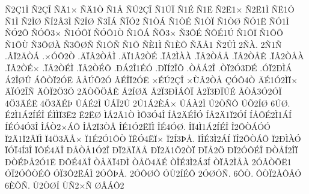 {^^d12^^c71^^cc
^^d12^^c7^^ce
^^d1^^c41^^d7
^^d1^^c41^^d2
^^d11^^c5
^^d1^^da2^^c7^^ce
^^d11^^da^^cf
^^d11^^c9
^^d11^^cb
^^d12^^cb1^^d7
^^d12^^cb1^^cc
^^d1^^cb1^^d3
^^d11^^cc
^^d12^^cc^^d8
^^d1^^cd2^^c23^^cc
^^d12^^cd^^d8
^^d13^^ce^^c1
^^d1^^ce^^d32
^^d11^^d2^^c1
^^d11^^d2^^c9
^^d11^^d2^^cf
^^d11^^d2^^d8
^^d1^^d31^^cb
^^d1^^d31^^cc
^^d1^^d32^^d4
^^d1^^d3^^d43^^d7
^^d11^^d3^^d4^^cf
^^d1^^d3^^d41^^d2
^^d11^^d4^^c1
^^d1^^d43^^d7
^^d13^^d4^^c9
^^d1^^d4^^c91^^da
^^d11^^d4^^cf
^^d11^^d4^^d5
^^d11^^d4^^d9
^^d13^^d4^^d8^^c0
^^d13^^d4^^d8^^d1
^^d11^^d4^^d1
^^d11^^d5
^^d1^^c81^^cc
^^d11^^c8^^d5
^^d1^^c3^^c51
^^d12^^db^^cc
2^^d1^^c0.
2^^d11^^d1
%
.^^c2^^cf2^^c4^^d2^^c1
.^^d7^^d3^^d42^^d2
.^^c4^^cf^^c22^^d2^^c5^^cc
.^^c4^^cf1^^c22^^d2^^c9
.^^cf^^c22^^cc^^c0^^c0
.^^cf^^c22^^d2^^c5^^c5
.^^cf^^c22^^d2^^c5^^ca
.^^cf^^c22^^d2^^c5^^c0
.^^cf^^c22^^d2^^c9^^d7
.^^cf^^c22^^d2^^c9^^cc
.^^cf^^c22^^d2^^c9^^d4
.^^d0^^c12^^ce1^^c9^^d3
.^^d0^^cf^^cd2^^ce^^d5
.^^d2^^c5^^c12^^ce
.^^d2^^cf2^^d33^^d0^^c9
.^^d3^^cf2^^d0^^cc^^c1
^^c12^^ce^^d8^^db
^^c1^^d4^^d2^^cf2^^d3^^cb
^^c2^^c5^^da^^d52^^d3
^^c2^^c9^^ce^^cf2^^d3^^cb
^^d7^^c9^^da2^^c7^^ce
^^d7^^d9^^c22^^d2^^c5
^^c7^^d3^^d44^^d2
^^c4^^c91^^d32^^cc^^cf^^d7
^^c4^^cf^^d32^^ce^^d1
^^c4^^d2^^cf2^^d63^^d6
2^^c4^^d2^^d5^^d6^^c5^^ca
^^c52^^cd^^d8^^c4
^^c52^^cf3^^d0^^cc^^c1^^d4^^cf
^^c52^^cf3^^d0^^cf^^da^^c9
^^c5^^d2^^c53^^d32^^d3^^cf
4^^d63^^c4^^c9^^cb
4^^d63^^c4^^c9^^de
^^da^^c1^^c92^^cc
^^da^^c1^^cf2^^da
2^^da1^^c12^^c8^^c1^^d7
^^da^^c1^^c02^^cc
^^da2^^d2^^d1^^d4
^^da^^d52^^cd^^d8
6^^da^^d8.
^^c92^^cc1^^c12^^cd^^c9^^ce
^^c9^^cc^^cc^^cf3^^cb2
^^ca2^^cb^^d8
^^cc^^c12^^c21^^d2
^^cc^^d53^^d34^^ce
^^cd^^c52^^c4^^c9^^ce^^d3
^^cd^^c52^^c41^^cf2^^d3^^cd
^^cd^^c5^^d4^^c92^^cc1^^c1^^cd
^^cd^^c9^^d34^^d33^^ce
^^ce^^c1^^d22^^d7^^c1^^d4
^^ce^^c52^^cf3^^d2^^c5
^^ce^^c91^^d32^^cb^^cf^^cc
^^ce^^c94^^d3^^d8.
^^ce^^cf4^^cc1^^c12^^cd^^c9^^ce
^^ce2^^d4^^d2^^c1^^d3^^d3
^^cf2^^c41^^cf2^^c2^^cf^^cc
^^cf4^^d63^^c4^^c5^^d7
^^cf1^^c92^^d31^^d4^^d2
^^cf^^ca^^d34^^cb^^cf^^d7
^^cf2^^cd3^^de^^c5.
^^cf^^ce^^c93^^cc2^^c1^^cd
^^cf^^ce2^^d4^^d2^^c1^^d4
^^cf2^^d0^^cc^^c0^^d3
^^cf^^d3^^cf4^^cd3^^ce
^^cf^^d4^^c94^^c4^^ce
^^d0^^c5^^d2^^c51^^d32^^ce
^^d0^^cf2^^c4^^cf^^c4^^c5
^^d0^^cf2^^c41^^d52^^d2^^cf
^^d0^^cf^^c52^^d6
^^d0^^cf2^^d3^^d4^^c9^^ce
^^d0^^d2^^c5^^cd2^^ce^^cf
^^d0^^d2^^c9^^de^^c52^^d31^^cb
^^d0^^d4^^c94^^c4^^ce
^^d2^^c5^^c4^^cf4^^d0^^cc
^^d2^^c5^^d64^^c4^^c9
^^d2^^ce^^c93^^cc2^^c13^^cd
^^d2^^cf^^c22^^cc^^c5^^c0
2^^d3^^c2^^d2^^d5^^cb1
^^d3^^cf2^^d3^^d4^^d2^^c9^^d4
^^d3^^cf3^^d42^^cb^^c1^^cc
2^^d3^^d4^^de^^c5.
2^^d3^^d4^^d8^^d4
^^d3^^d92^^cd^^c9^^d4
2^^d3^^d8^^d3^^d1.
6^^d4^^d2.
^^d4^^d2^^cf2^^c5^^d4^^c5^^d3
6^^c8^^d5^^d1.
^^d92^^d2^^d8^^cd
^^d9^^d12^^d7^^d1
^^d8^^c2^^c1^^d42
}
